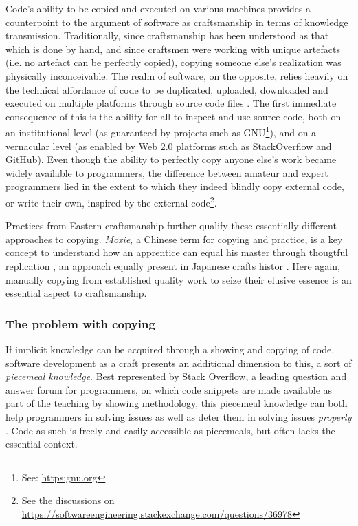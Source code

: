 Code's ability to be copied and executed on various machines provides a counterpoint to the argument of software as craftsmanship in terms of knowledge transmission. Traditionally, since craftsmanship has been understood as that which is done by hand, and since craftsmen were working with unique artefacts (i.e. no artefact can be perfectly copied), copying someone else's realization was physically inconceivable. The realm of software, on the opposite, relies heavily on the technical affordance of code to be duplicated, uploaded, downloaded and executed on multiple platforms through source code files \citep{manovich_language_2001}. The first immediate consequence of this is the ability for all to inspect and use source code, both on an institutional level (as guaranteed by projects such as GNU\footnote{See: \url{https:gnu.org}}), and on a vernacular level (as enabled by Web 2.0 platforms such as StackOverflow and GitHub). Even though the ability to perfectly copy anyone else's work became widely available to programmers, the difference between amateur and expert programmers lied in the extent to which they indeed blindly copy external code, or write their own, inspired by the external code\footnote{See the discussions on \url{https://softwareengineering.stackexchange.com/questions/36978}}.

Practices from Eastern craftsmanship further qualify these essentially different approaches to copying. \emph{Moxie}, a Chinese term for copying and practice, is a key concept to understand how an apprentice can equal his master through thougtful replication  \citep{man_influence_2015}, an approach equally present in Japanese crafts histor \citep{jordan_copying_2003}. Here again, manually copying from established quality work to seize their elusive essence is an essential aspect to craftsmanship.

\subsubsection{The problem with copying}

If implicit knowledge can be acquired through a showing and copying of code, software development as a craft presents an additional dimension to this, a sort of \emph{piecemeal knowledge}. Best represented by Stack Overflow, a leading question and answer forum for programmers, on which code snippets are made available as part of the teaching by showing methodology, this piecemeal knowledge can both help programmers in solving issues as well as deter them in solving issues \textit{properly} \citep{treude_understanding_2017}. Code as such is freely and easily accessible as piecemeals, but often lacks the essential context.


